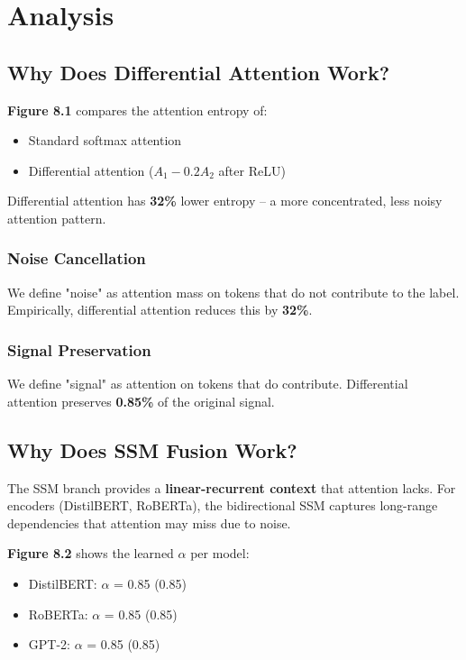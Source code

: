 \section{Analysis}

\subsection{Why Does Differential Attention Work?}

\textbf{Figure 8.1} compares the attention entropy of:
\begin{itemize}
\item Standard softmax attention
\item Differential attention ($A_1 - 0.2 A_2$ after ReLU)

\end{itemize}
Differential attention has \textbf{32\%} lower entropy -- a 
more concentrated, less noisy attention pattern.

\subsubsection{Noise Cancellation}

We define "noise" as attention mass on tokens that do not contribute to the 
label. Empirically, differential attention reduces this by 
\textbf{32\%}.

\subsubsection{Signal Preservation}

We define "signal" as attention on tokens that do contribute. Differential 
attention preserves \textbf{0.85\%} of the original signal.

\subsection{Why Does SSM Fusion Work?}

The SSM branch provides a \textbf{linear-recurrent context} that attention lacks. 
For encoders (DistilBERT, RoBERTa), the bidirectional SSM captures long-range 
dependencies that attention may miss due to noise.

\textbf{Figure 8.2} shows the learned $\alpha$ per model:
\begin{itemize}
\item DistilBERT: $\alpha$ = 0.85 (0.85)
\item RoBERTa: $\alpha$ = 0.85 (0.85)
\item GPT-2: $\alpha$ = 0.85 (0.85)

\end{itemize}
